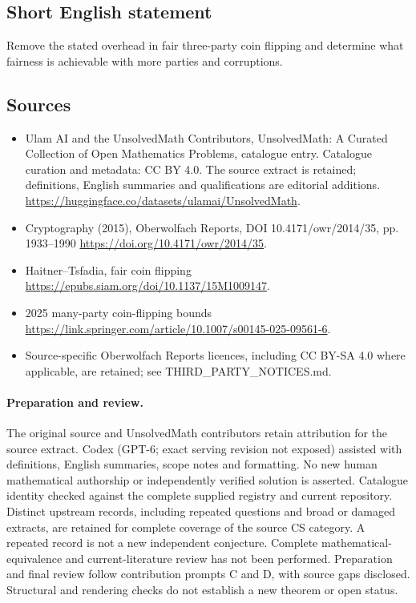 \documentclass[11pt]{article}
\begin{document}
\subsection{Short English statement}
Remove the stated overhead in fair three-party coin flipping and determine what fairness is achievable with more parties and corruptions.
\subsection{Sources}
\begin{itemize}
\item[\hypertarget{source:statement:1}{S1}] Ulam AI and the UnsolvedMath Contributors, UnsolvedMath: A Curated Collection of Open Mathematics Problems, catalogue entry. Catalogue curation and metadata: CC BY 4.0. The source extract is retained; definitions, English summaries and qualifications are editorial additions.
\url{https://huggingface.co/datasets/ulamai/UnsolvedMath}.
\item[\hypertarget{source:statement:2}{S2}] Cryptography (2015), Oberwolfach Reports, DOI 10.4171/owr/2014/35, pp. 1933--1990
\url{https://doi.org/10.4171/owr/2014/35}.
\item[\hypertarget{source:statement:3}{S3}] Haitner--Tsfadia, fair coin flipping
\url{https://epubs.siam.org/doi/10.1137/15M1009147}.
\item[\hypertarget{source:statement:4}{S4}] 2025 many-party coin-flipping bounds
\url{https://link.springer.com/article/10.1007/s00145-025-09561-6}.
\item Source-specific Oberwolfach Reports licences, including CC BY-SA 4.0 where applicable, are retained; see THIRD\_PARTY\_NOTICES.md.
\end{itemize}
\paragraph{Preparation and review.}
The original source and UnsolvedMath contributors retain attribution for the source extract. Codex (GPT-6; exact serving revision not exposed) assisted with definitions, English summaries, scope notes and formatting. No new human mathematical authorship or independently verified solution is asserted. Catalogue identity checked against the complete supplied registry and current repository. Distinct upstream records, including repeated questions and broad or damaged extracts, are retained for complete coverage of the source CS category. A repeated record is not a new independent conjecture. Complete mathematical-equivalence and current-literature review has not been performed. Preparation and final review follow contribution prompts C and D, with source gaps disclosed. Structural and rendering checks do not establish a new theorem or open status.
\label{end:statement}
\end{document}
